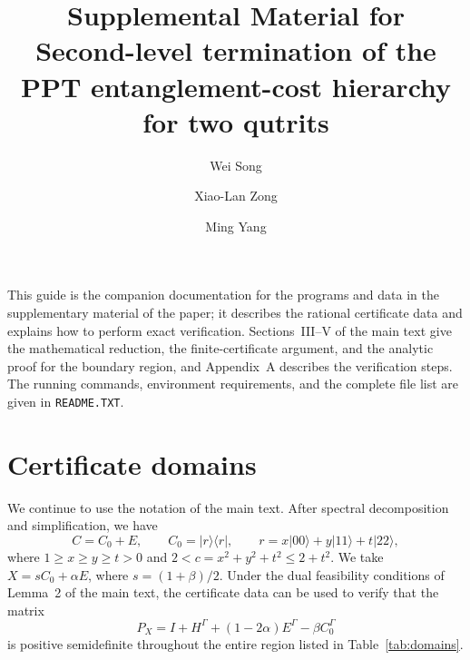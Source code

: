 \documentclass[aps,pra,onecolumn,notitlepage,10pt,amsmath,amssymb,nofootinbib]{revtex4-1}
\begin{document}
\title{Supplemental Material for\texorpdfstring{\\}{ }
Second-level termination of the PPT entanglement-cost hierarchy for two qutrits}
\author{Wei Song}
\author{Xiao-Lan Zong}
\author{Ming Yang}

\maketitle

This guide is the companion documentation for the programs and data in the supplementary material of the paper; it describes the rational certificate data and explains how to perform exact verification. Sections~III--V of the main text give the mathematical reduction, the finite-certificate argument, and the analytic proof for the boundary region, and Appendix~A describes the verification steps. The running commands, environment requirements, and the complete file list are given in \texttt{README.TXT}.

\section{Certificate domains}
We continue to use the notation of the main text. After spectral decomposition and simplification, we have
\begin{equation}
 C=C_0+E,\qquad C_0=|r\rangle\langle r|,\qquad
 r=x|00\rangle+y|11\rangle+t|22\rangle,
\end{equation}
where \(1\ge x\ge y\ge t>0\) and \(2<c=x^2+y^2+t^2\le2+t^2\).
We take \(X=sC_0+\alpha E\), where \(s=(1+\beta)/2\).
Under the dual feasibility conditions of Lemma~2 of the main text, the certificate data can be used to verify that the matrix
\begin{equation}
 P_X=I+H^\Gamma+(1-2\alpha)E^\Gamma-\beta C_0^\Gamma
\end{equation}
is positive semidefinite throughout the entire region listed in Table~\ref{tab:domains}.
\end{document}

